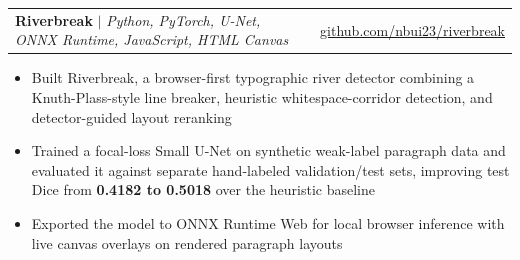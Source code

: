 \documentclass[letterpaper,10pt]{article}  %
\makeatletter
\newcommand{\resumeItem}[1]{
  \item\small{  %
    {#1 \vspace{0pt}}  %
  }
}
\newcommand{\resumeSubheading}[3]{
    \item
    \begin{tabular*}{0.97\textwidth}[t]{l@{\extracolsep{\fill}}r}
      \textbf{#1} $|$ \textit{ #2} & #3 \\  %
    \end{tabular*}\vspace{-3pt}  %
}
\newcommand{\resumeItemListStart}{\begin{itemize}[topsep=1.5pt, itemsep=0pt, parsep=0pt, partopsep=0pt]}
\newcommand{\resumeItemListEnd}{\end{itemize}\vspace{-1pt}}  %
\makeatother
\begin{document}
        \resumeSubheading{Riverbreak}{Python, PyTorch, U-Net, ONNX Runtime, JavaScript, HTML Canvas}{\href{https://github.com/nbui23/riverbreak}{\footnotesize github.com/nbui23/riverbreak}}
            \resumeItemListStart
                \resumeItem{Built Riverbreak, a browser-first typographic river detector combining a Knuth-Plass-style line breaker, heuristic whitespace-corridor detection, and detector-guided layout reranking}
                \resumeItem{Trained a focal-loss Small U-Net on synthetic weak-label paragraph data and evaluated it against separate hand-labeled validation/test sets, improving test Dice from \textbf{0.4182 to 0.5018} over the heuristic baseline}
                \resumeItem{Exported the model to ONNX Runtime Web for local browser inference with live canvas overlays on rendered paragraph layouts}
            \resumeItemListEnd



\end{document}
